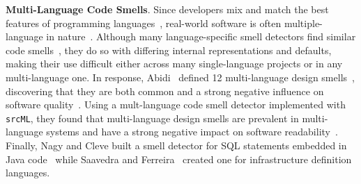 





{\bf Multi-Language Code Smells}.
%
Since developers mix and match the best features of programming
languages~\cite{7476675}, real-world software is often multiple-language in
nature~\cite{723183}.
%
Although many language-specific smell detectors find similar code
smells~\cite{PMD,CheckStyle,Pysmell,Jscent,DesigniteJava}, they do so with
differing internal representations and defaults, making their use difficult
either across many single-language projects or in any multi-language one.
%
In response, Abidi~\etal{} defined 12 multi-language design
smells~\cite{MultiLanguageCodeSmells}, discovering that they are both common
and a strong negative influence on software quality~\cite{Abidi2}.
%
Using a mult-language code smell detector implemented with \texttt{srcML}, they
found that multi-language design smells are prevalent in multi-language systems
and have a strong negative impact on software readability~\cite{Fault-Prone}.
%
Finally, Nagy and Cleve built a smell detector for SQL statements embedded in
Java code~\cite{SQLInJava} while Saavedra and Ferreira~\cite{Saavedra2023}
created one for infrastructure definition languages.
